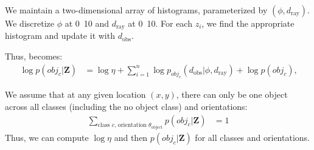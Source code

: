 We maintain a two-dimensional array of histograms, parameterized by $(\phi,
d_{\text{ray}})$. We discretize $\phi$ at \unit{0.10}{\rad} and
$d_{\text{ray}}$ at \unit{0.10}{\m}. For each $z_i$, we find the appropriate
histogram and update it with $d_{\text{obs}}$.

Thus,  becomes:
%
\begin{align}
  \log p( obj_c | \mathbf{Z} ) &=
   \log{\eta} + \sum_{i=1}^{n} { \log p_{obj_c}( d_{\text{obs}} | \phi, d_{\text{ray}}) }
   + \log p(obj_c)
   \text{,}
   \label{eq:obj_model_pos}
\end{align}

We assume that at any given location $(x, y)$, there can only be one object
across all classes (including the no object class) and orientations:
%
\begin{align}
  \sum_{ \text{class $c$, orientation $\theta_{\text{object}}$} }
  p(obj_c | \mathbf{Z})
  &= 1
\end{align}
%
Thus, we can compute $\log \eta$ and then $p(obj_c | \mathbf{Z})$ for all
classes and orientations.
